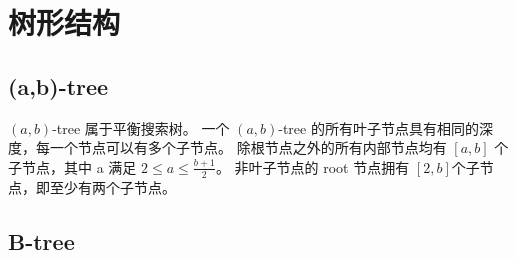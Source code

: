 \section{树形结构}
\subsection{(a,b)-tree}
$(a,b)$-tree 属于平衡搜索树。
一个 $(a,b)$-tree 的所有叶子节点具有相同的深度，每一个节点可以有多个子节点。
除根节点之外的所有内部节点均有 $[a,b]$ 个子节点，其中 a 满足 $2 \le a \le \frac{b+1}{2}$。
非叶子节点的 root 节点拥有 $[2,b]$个子节点，即至少有两个子节点。
\subsection{B-tree}

